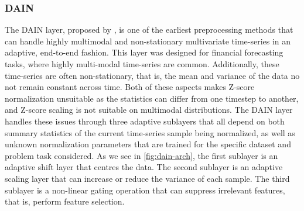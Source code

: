 \documentclass{statsmsc}
\begin{document}
{%
\subsubsection{DAIN}%
\label{ssub:DAIN}




The \acf{DAIN} layer, proposed by \cite{dain}, is one of the earliest preprocessing methods that can
handle highly multimodal and non-stationary multivariate time-series in an adaptive,
end-to-end fashion.
This layer was designed for financial forecasting tasks, where highly multi-modal
time-series are common. Additionally, these time-series are often non-stationary, that is, the
mean and variance of the data no not remain constant across time.
Both of these aspects makes Z-score normalization unsuitable as the statistics can differ
from one timestep to another, and Z-score scaling is not suitable on multimodal distributions.
The \ac{DAIN} layer handles these issues through three adaptive sublayers that all depend
on both summary statistics of the current time-series sample being normalized, as well as unknown normalization
parameters that are trained for the specific dataset and problem task considered.
As we see in \cref{fig:dain-arch}, the first sublayer is an adaptive shift layer
that centres the data. The second sublayer is an adaptive scaling layer that can increase or
reduce the variance of each sample. The third sublayer is a non-linear gating operation
that can suppress irrelevant features, that is, perform feature selection.


}
\end{document}
